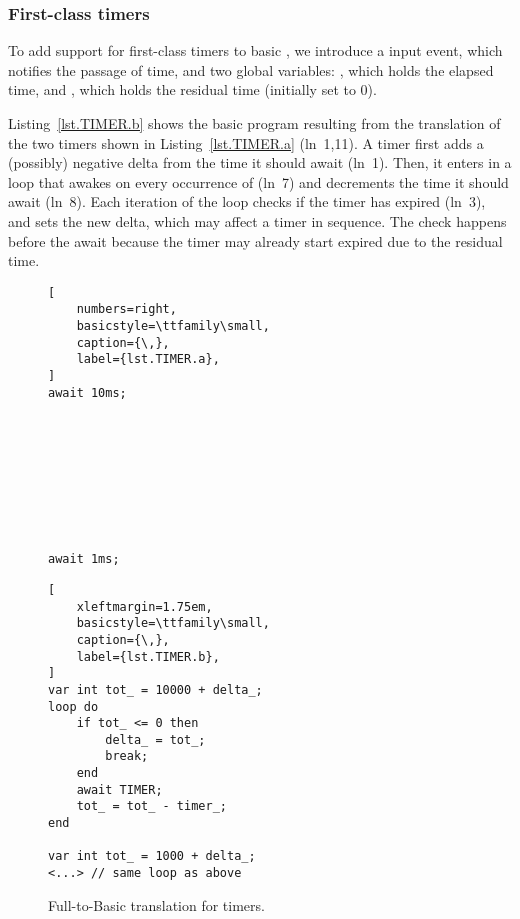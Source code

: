 \subsubsection*{First-class timers}

To add support for first-class timers to basic \CEU , we introduce a
 input event, which notifies the passage of time, and two global
variables: , which holds the elapsed time, and ,
which holds the residual time (initially set to 0).

Listing~\ref{lst.TIMER.b} shows the basic \CEU program resulting from the
translation of the two timers shown in Listing~\ref{lst.TIMER.a} (ln~1,11).
A timer first adds a (possibly) negative delta from the time it should await
(ln~1).  Then, it enters in a loop that awakes on every occurrence of
 (ln~7) and decrements the time it should await (ln~8).  Each
iteration of the loop checks if the timer has expired (ln~3), and sets the
new delta, which may affect a timer in sequence.  The check happens before
the await because the timer may already start expired due to the residual
time.

\begin{figure}[!ht]
\begin{minipage}[t]{0.33\linewidth}
\begin{lstlisting}[
    numbers=right,
    basicstyle=\ttfamily\small,
    caption={\,},
    label={lst.TIMER.a},
]
await 10ms;









await 1ms;

\end{lstlisting}
\end{minipage}
%
\begin{minipage}[t]{0.63\linewidth}
\begin{lstlisting}[
    xleftmargin=1.75em,
    basicstyle=\ttfamily\small,
    caption={\,},
    label={lst.TIMER.b},
]
var int tot_ = 10000 + delta_;
loop do
    if tot_ <= 0 then
        delta_ = tot_;
        break;
    end
    await TIMER;
    tot_ = tot_ - timer_;
end

var int tot_ = 1000 + delta_;
<...> // same loop as above
\end{lstlisting}
\end{minipage}
\caption{ Full-to-Basic translation for timers. }
\label{lst.TIMER}
\end{figure}

